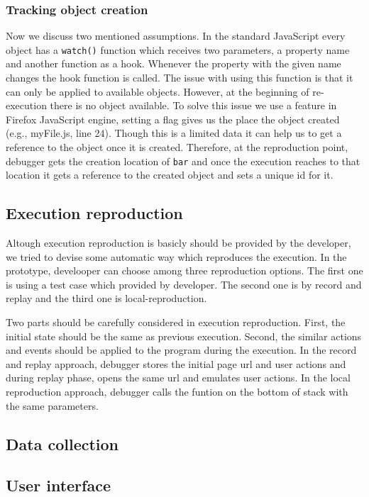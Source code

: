 \documentclass[preprint]{sigplanconf}
\begin{document}
\subsubsection{Tracking object creation}
Now we discuss two mentioned assumptions. In the standard JavaScript every object has a \texttt{watch()} function which receives two parameters, a property name and another function as a hook. Whenever the property with the given name changes the hook function is called. The issue with using this function is that it can only be applied to available objects. However, at the beginning of re-execution there is no object available. To solve this issue we use a feature in Firefox JavaScript engine, setting a flag gives us the place the object created (e.g., myFile.js, line 24). Though this is a limited data it can help us to get a reference to the object once it is created. Therefore, at the reproduction point, debugger gets the creation location of \texttt{bar} and once the execution reaches to that location it gets a reference to the created object and sets a unique id for it.


\subsection{Execution reproduction}
Altough execution reproduction is basicly should be provided by the developer, we tried to devise some automatic way which reproduces the execution. In the prototype, develooper can choose among three reproduction options. The first one is using a test case which provided by developer. The second one is by record and replay and the third one is local-reproduction.

Two parts should be carefully considered in execution reproduction. First, the initial state should be the same as previous execution. Second, the similar actions and events should be applied to the program during the execution. In the record and replay approach, debugger stores the initial page url and user actions and during replay phase, opens the same url and emulates user actions. 
In the local reproduction approach, debugger calls the funtion on the bottom of stack with the same parameters.

\subsection{Data collection}

\subsection{User interface}
\end{document}
